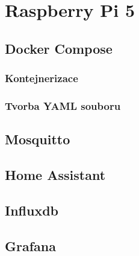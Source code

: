 \chapter{Raspberry Pi 5}
\section{Docker Compose}
\subsection{Kontejnerizace}
\subsection{Tvorba YAML souboru}
\section{Mosquitto}
\section{Home Assistant}
\section{Influxdb}
\section{Grafana}